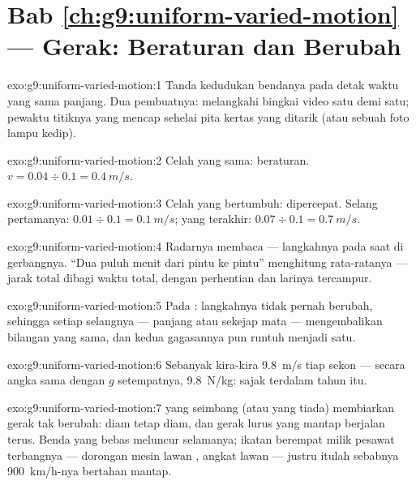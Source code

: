 \section*{Bab \ref{ch:g9:uniform-varied-motion} --- Gerak: Beraturan dan Berubah}

\begin{solution}{exo:g9:uniform-varied-motion:1}
Tanda kedudukan bendanya pada detak waktu yang sama panjang. Dua
pembuatnya: melangkahi bingkai video satu demi satu; pewaktu titiknya
yang mencap sehelai pita kertas yang ditarik (atau sebuah foto lampu
kedip).
\end{solution}

\begin{solution}{exo:g9:uniform-varied-motion:2}
Celah yang sama: beraturan. $v = 0.04 \div 0.1 = \qty{0.4}{m/s}$.
\end{solution}

\begin{solution}{exo:g9:uniform-varied-motion:3}
Celah yang bertumbuh: dipercepat. Selang pertamanya: $0.01 \div 0.1 =
\qty{0.1}{m/s}$; yang terakhir: $0.07 \div 0.1 = \qty{0.7}{m/s}$.
\end{solution}

\begin{solution}{exo:g9:uniform-varied-motion:4}
Radarnya membaca  --- langkahnya pada saat di
gerbangnya. ``Dua puluh menit dari pintu ke pintu'' menghitung
rata-ratanya --- jarak total dibagi waktu total, dengan perhentian dan
larinya tercampur.
\end{solution}

\begin{solution}{exo:g9:uniform-varied-motion:5}
Pada : langkahnya tidak pernah berubah, sehingga setiap
selangnya --- panjang atau sekejap mata --- mengembalikan bilangan yang
sama, dan kedua gagasannya pun runtuh menjadi satu.
\end{solution}

\begin{solution}{exo:g9:uniform-varied-motion:6}
Sebanyak kira-kira \qty{9.8}{m/s} tiap sekon --- secara angka sama
dengan $g$ setempatnya, \qty{9.8}{N/kg}: sajak terdalam tahun itu.
\end{solution}

\begin{solution}{exo:g9:uniform-varied-motion:7}
 yang seimbang (atau yang tiada) membiarkan gerak tak berubah:
diam tetap diam, dan gerak lurus yang mantap berjalan terus. Benda yang
bebas  meluncur selamanya; ikatan berempat milik pesawat
terbangnya --- dorongan mesin lawan  ,  angkat lawan
 --- justru itulah sebabnya \qty{900}{km/h}-nya bertahan mantap.
\end{solution}

